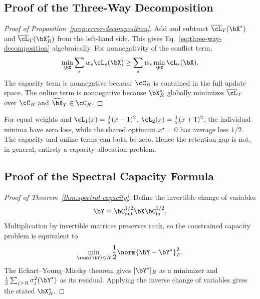 \subsection{Proof of the Three-Way Decomposition}

\begin{proof}[Proof of Proposition~\ref{prop:error-decomposition}]
Add and subtract $\overline{\cL}_T(\bX^\star)$ and
$\overline{\cL}_T(\bX_R^\star)$ from the left-hand side. This gives
Eq.~\eqref{eq:three-way-decomposition} algebraically. For nonnegativity of the
conflict term,
\begin{equation}
\min_{\bX}\sum_s w_s\cL_s(\bX)
\geq \sum_s w_s\min_{\bX}\cL_s(\bX).
\end{equation}
The capacity term is nonnegative because $\cC_R$ is contained in the full
update space. The online term is nonnegative because $\bX_R^\star$ globally
minimizes $\overline{\cL}_T$ over $\cC_R$ and
$\widehat{\bX}_T\in\cC_R$.
\end{proof}

\begin{remark}
For equal weights and
$\cL_1(x)=\frac12(x-1)^2$, $\cL_2(x)=\frac12(x+1)^2$, the individual minima
have zero loss, while the shared optimum $x^\star=0$ has average loss $1/2$.
The capacity and online terms can both be zero. Hence the retention gap is not,
in general, entirely a capacity-allocation problem.
\end{remark}

\subsection{Proof of the Spectral Capacity Formula}

\begin{proof}[Proof of Theorem~\ref{thm:spectral-capacity}]
Define the invertible change of variables
\begin{equation}
\bY=\bC_{\mathrm{out}}^{1/2}\bX\bC_{\mathrm{in}}^{1/2}.
\end{equation}
Multiplication by invertible matrices preserves rank, so the constrained
capacity problem is equivalent to
\begin{equation}
\min_{\rank(\bY)\leq R}\frac12\norm{\bY-\bY^\star}_F^2.
\end{equation}
The Eckart--Young--Mirsky theorem gives $[\bY^\star]_R$ as a minimizer and
$\frac12\sum_{j>R}\sigma_j^2(\bY^\star)$ as its residual. Applying the inverse
change of variables gives the stated $\bX_R^\star$.
\end{proof}

